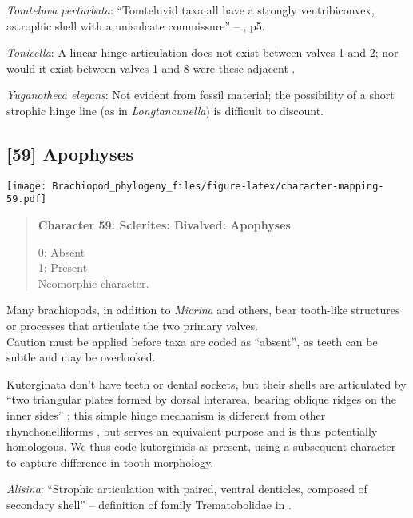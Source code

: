 \documentclass[openany]{book}
\theoremstyle{definition}
\theoremstyle{definition}
\theoremstyle{definition}
\theoremstyle{remark}
\begin{document}
\hypertarget{Tomteluva_perturbata-coding-58}{}
\emph{Tomteluva perturbata}: ``Tomteluvid taxa all have a strongly
ventribiconvex, astrophic shell with a unisulcate commissure'' --
\citet{Streng2016Anew}, p5.

\hypertarget{Tonicella-coding-58}{}
\emph{Tonicella}: A linear hinge articulation does not exist between
valves 1 and 2; nor would it exist between valves 1 and 8 were these
adjacent \citep{Connors2012}.

\hypertarget{Yuganotheca_elegans-coding-58}{}
\emph{Yuganotheca elegans}: Not evident from fossil material; the
possibility of a short strophic hinge line (as in \emph{Longtancunella})
is difficult to discount.

\subsection*{{[}59{]} Apophyses}\label{apophyses}

\texttt{[image: Brachiopod\_phylogeny\_files/figure-latex/character-mapping-59.pdf]}

\begin{quote}
\textbf{Character 59: Sclerites: Bivalved: Apophyses}

0: Absent\\
1: Present\\
Neomorphic character.
\end{quote}

Many brachiopods, in addition to \emph{Micrina} and others, bear
tooth-like structures or processes that articulate the two primary
valves.\\
Caution must be applied before taxa are coded as ``absent'', as teeth
can be subtle and may be overlooked.

Kutorginata don't have teeth or dental sockets, but their shells are
articulated by ``two triangular plates formed by dorsal interarea,
bearing oblique ridges on the inner sides''
\citep[p.~211]{Williams2000LinguliformeaCraniiformea}; this simple hinge
mechanism is different from other rhynchonelliforms
\citep[p.208]{Williams2000LinguliformeaCraniiformea}, but serves an
equivalent purpose and is thus potentially homologous. We thus code
kutorginids as present, using a subsequent character to capture
difference in tooth morphology.

\hypertarget{Alisina-coding-59}{}
\emph{Alisina}: ``Strophic articulation with paired, ventral denticles,
composed of secondary shell'' -- definition of family Trematobolidae in
\citet{Williams2000LinguliformeaCraniiformea}.
\end{document}
